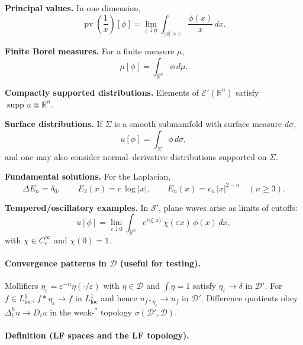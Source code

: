 \documentclass[12pt,a4paper]{article}
\theoremstyle{plain}
\theoremstyle{definition}
\theoremstyle{remark}
\theoremstyle{remark}
\begin{document}
\medskip

\textbf{Principal values.}
In one dimension,
\[
\operatorname{pv}\!\left(\frac{1}{x}\right)[\phi]
=\lim_{\varepsilon\downarrow0}\int_{|x|>\varepsilon}\frac{\phi(x)}{x}\,dx .
\]

\medskip

\textbf{Finite Borel measures.}
For a finite measure $\mu$,
\[
\mu[\phi]=\int_{\mathbb R^n}\phi\,d\mu .
\]

\medskip

\textbf{Compactly supported distributions.}
Elements of $\mathcal E'(\mathbb R^n)$ satisfy $\operatorname{supp}u\Subset\mathbb R^n$.

\medskip

\textbf{Surface distributions.}
If $\Sigma$ is a smooth submanifold with surface measure $d\sigma$,
\[
u[\phi]=\int_{\Sigma}\phi\,d\sigma ,
\]
and one may also consider normal–derivative distributions supported on $\Sigma$.

\medskip

\textbf{Fundamental solutions.}
For the Laplacian,
\[
\Delta E_n=\delta_0,\qquad
E_2(x)=c\,\log|x|,\qquad
E_n(x)=c_n\,|x|^{2-n}\quad(n\ge3).
\]

\medskip

\textbf{Tempered/oscillatory examples.}
In $\mathcal S'$, plane waves arise as limits of cutoffs:
\[
u[\phi]=\lim_{\varepsilon\downarrow0}\int_{\mathbb R^n}
e^{i\langle\xi,x\rangle}\,\chi(\varepsilon x)\,\phi(x)\,dx ,
\]
with $\chi\in C_c^\infty$ and $\chi(0)=1$.


\bigskip

\paragraph{Convergence patterns in $\mathcal D$ (useful for testing).}
Mollifiers $\eta_\varepsilon=\varepsilon^{-n}\eta(\cdot/\varepsilon)$ with $\eta\in\mathcal D$ and $\int\eta=1$ satisfy $\eta_\varepsilon\to\delta$ in $\mathcal D'$.
For $f\in L^1_{\mathrm{loc}}$, $f\ast\eta_\varepsilon\to f$ in $L^1_{\mathrm{loc}}$ and hence $u_{f\ast\eta_\varepsilon}\to u_f$ in $\mathcal D'$.
Difference quotients obey $\Delta_i^h u\to D_i u$ in the weak-$^\ast$ topology $\sigma(\mathcal D',\mathcal D)$.

\bigskip

\paragraph{Definition (LF spaces and the LF topology).}
\end{document}
